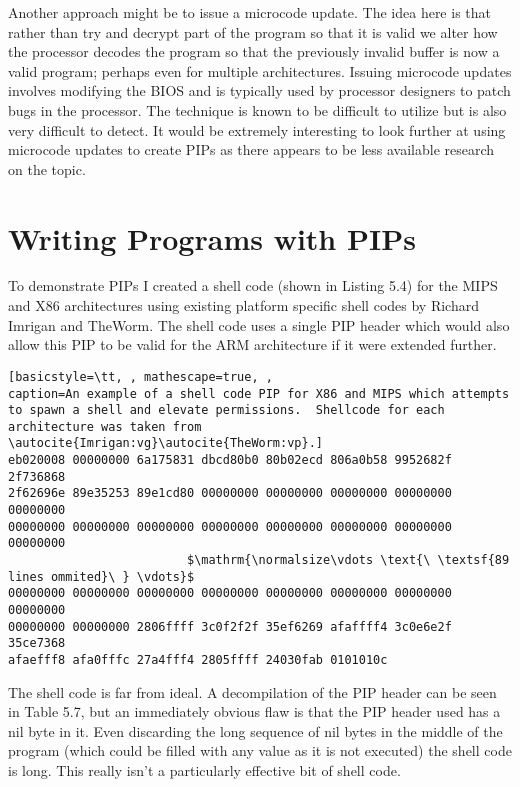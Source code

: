 \documentclass[10pt,]{book}
\begin{document}
Another approach might be to issue a microcode
update\autocite{Smotherman:2010wr}. The idea here is that rather than
try and decrypt part of the program so that it is valid we alter how the
processor decodes the program so that the previously invalid buffer is
now a valid program; perhaps even for multiple architectures. Issuing
microcode updates involves modifying the BIOS and is typically used by
processor designers to patch bugs in the processor. The technique is
known to be difficult to utilize\autocite{Skoudis:2004to} but is also
very difficult to detect. It would be extremely interesting to look
further at using microcode updates to create PIPs as there appears to be
less available research on the topic.

\section{Writing Programs with PIPs}

To demonstrate PIPs I created a shell code (shown in Listing 5.4) for
the MIPS and X86 architectures using existing platform specific shell
codes by Richard Imrigan\autocite{Imrigan:vg} and
TheWorm\autocite{TheWorm:vp}. The shell code uses a single PIP header
which would also allow this PIP to be valid for the ARM architecture if
it were extended further.

\begin{lstlisting}[basicstyle=\tt, , mathescape=true, ,
caption=An example of a shell code PIP for X86 and MIPS which attempts to spawn a shell and elevate permissions.  Shellcode for each architecture was taken from \autocite{Imrigan:vg}\autocite{TheWorm:vp}.]
eb020008 00000000 6a175831 dbcd80b0 80b02ecd 806a0b58 9952682f 2f736868
2f62696e 89e35253 89e1cd80 00000000 00000000 00000000 00000000 00000000
00000000 00000000 00000000 00000000 00000000 00000000 00000000 00000000
                         $\mathrm{\normalsize\vdots \text{\ \textsf{89 lines ommited}\ } \vdots}$ 
00000000 00000000 00000000 00000000 00000000 00000000 00000000 00000000
00000000 00000000 2806ffff 3c0f2f2f 35ef6269 afaffff4 3c0e6e2f 35ce7368
afaefff8 afa0fffc 27a4fff4 2805ffff 24030fab 0101010c 
\end{lstlisting}
The shell code is far from ideal. A decompilation of the PIP header can
be seen in Table 5.7, but an immediately obvious flaw is that the PIP
header used has a nil byte in it. Even discarding the long sequence of
nil bytes in the middle of the program (which could be filled with any
value as it is not executed) the shell code is long. This really isn't a
particularly effective bit of shell code.
\end{document}
